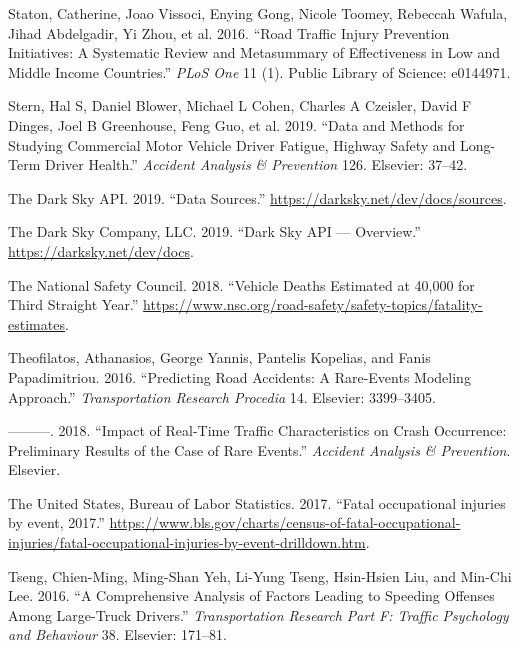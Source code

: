 \documentclass[12pt]{book}
\numberwithin{equation}{chapter}
\begin{document}
\leavevmode\hypertarget{ref-staton2016road}{}%
Staton, Catherine, Joao Vissoci, Enying Gong, Nicole Toomey, Rebeccah Wafula, Jihad Abdelgadir, Yi Zhou, et al. 2016. ``Road Traffic Injury Prevention Initiatives: A Systematic Review and Metasummary of Effectiveness in Low and Middle Income Countries.'' \emph{PLoS One} 11 (1). Public Library of Science: e0144971.

\leavevmode\hypertarget{ref-stern2019data}{}%
Stern, Hal S, Daniel Blower, Michael L Cohen, Charles A Czeisler, David F Dinges, Joel B Greenhouse, Feng Guo, et al. 2019. ``Data and Methods for Studying Commercial Motor Vehicle Driver Fatigue, Highway Safety and Long-Term Driver Health.'' \emph{Accident Analysis \& Prevention} 126. Elsevier: 37--42.

\leavevmode\hypertarget{ref-darkskyds}{}%
The Dark Sky API. 2019. ``Data Sources.'' \url{https://darksky.net/dev/docs/sources}.

\leavevmode\hypertarget{ref-darksky}{}%
The Dark Sky Company, LLC. 2019. ``Dark Sky API --- Overview.'' \url{https://darksky.net/dev/docs}.

\leavevmode\hypertarget{ref-nsc2018}{}%
The National Safety Council. 2018. ``Vehicle Deaths Estimated at 40,000 for Third Straight Year.'' \url{https://www.nsc.org/road-safety/safety-topics/fatality-estimates}.

\leavevmode\hypertarget{ref-theofilatos2016predicting}{}%
Theofilatos, Athanasios, George Yannis, Pantelis Kopelias, and Fanis Papadimitriou. 2016. ``Predicting Road Accidents: A Rare-Events Modeling Approach.'' \emph{Transportation Research Procedia} 14. Elsevier: 3399--3405.

\leavevmode\hypertarget{ref-theofilatos2018impact}{}%
---------. 2018. ``Impact of Real-Time Traffic Characteristics on Crash Occurrence: Preliminary Results of the Case of Rare Events.'' \emph{Accident Analysis \& Prevention}. Elsevier.

\leavevmode\hypertarget{ref-bols}{}%
The United States, Bureau of Labor Statistics. 2017. ``Fatal occupational injuries by event, 2017.'' \url{https://www.bls.gov/charts/census-of-fatal-occupational-injuries/fatal-occupational-injuries-by-event-drilldown.htm}.

\leavevmode\hypertarget{ref-tseng2016comprehensive}{}%
Tseng, Chien-Ming, Ming-Shan Yeh, Li-Yung Tseng, Hsin-Hsien Liu, and Min-Chi Lee. 2016. ``A Comprehensive Analysis of Factors Leading to Speeding Offenses Among Large-Truck Drivers.'' \emph{Transportation Research Part F: Traffic Psychology and Behaviour} 38. Elsevier: 171--81.
\end{document}
